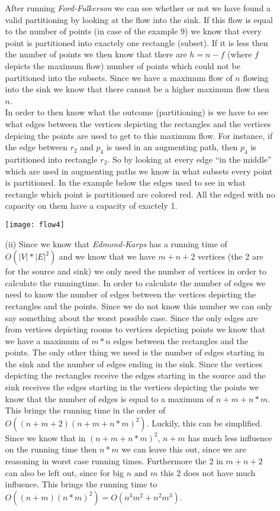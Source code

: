 \documentclass{article}
\begin{document}
\begin{itemize}
\begin{itemize}
After running \emph{Ford-Fulkerson} we can see whether or not we have found a valid partitioning by looking at the flow into the sink. If this flow is equal to the number of points (in case of the example 9) we know that every point is partitioned into exactely one rectangle (subset). If it is less then the number of points we then know that there are $h=n-f$ (where $f$ depicts the maximum flow) number of points which could not be partitioned into the subsets. Since we have a maximum flow of $n$ flowing into the sink we know that there cannot be a higher maximum flow then $n$. \\

In order to then know what the outcome (partitioning) is we have to see what edges between the vertices depicting the rectangles and the vertices depicing the points are used to get to this maximum flow. For instance, if the edge between $r_2$ and $p_4$ is used in an augmenting path, then $p_4$ is partitioned into rectangle $r_2$. So by looking at every edge ``in the middle'' which are used in augmenting paths we know in what subsets every point is partitioned. In the example below the edges used to see in what rectangle which point is partitioned are colored red. All the edged with no capacity on them have a capacity of exactely 1.

\texttt{[image: flow4]}

\item[(ii)] Since we know that \emph{Edmond-Karps} has a running time of $O(|V| * |E|^2)$ and we know that we have $m+n+2$ vertices (the 2 are for the source and sink) we only need the number of vertices in order to calculate the runningtime. In order to calculate the number of edges we need to know the number of edges between the vertices depicting the rectangles and the points. Since we do not know this number we can only say something about the worst possible case. Since the only edges are from vertices depicting rooms to vertices depicting points we know that we have a maximum of $m*n$ edges between the rectangles and the points. The only other thing we need is the number of edges starting in the sink and the number of edges ending in the sink. Since the vertices depicting the rectangles receive the edges starting in the source and the sink receives the edges starting in the vertices depicting the points we know that the number of edges is equal to a maximum of $n+m+n*m$. This brings the running time in the order of $O((n+m+2)(n+m+n*m)^2)$. Luckily, this can be simplified. Since we know that in $(n+m+n*m)^2$, $n+m$ has much less influence on the running time then $n*m$ we can leave this out, since we are reasoning in worst case running times. Furthermore the 2 in $m+n+2$ can also be left out, since for big $n\text{ and }m$ this 2 does not have much influence. This brings the running time to $O((n+m)(n*m)^2)=O(n^3m^2+n^2m^3)$.
\end{itemize}
\end{itemize}
\end{document}
